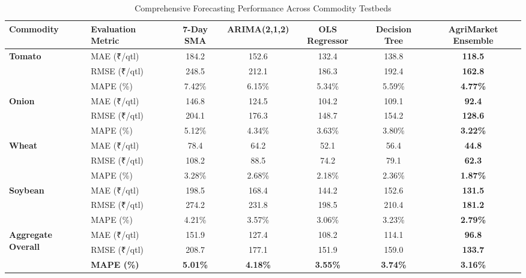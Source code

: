 \documentclass[conference]{IEEEtran}
\begin{document}
\begin{table}[htbp]
\caption{Comprehensive Forecasting Performance Across Commodity Testbeds}
\begin{center}
\begin{tabular}{llccccc}
\toprule
\textbf{Commodity} & \textbf{Evaluation Metric} & \textbf{7-Day SMA} & \textbf{ARIMA(2,1,2)} & \textbf{OLS Regressor} & \textbf{Decision Tree} & \textbf{AgriMarket Ensemble} \\
\midrule
\multirow{3}{*}{\textbf{Tomato}} 
& MAE (₹/qtl)   & 184.2 & 152.6 & 132.4 & 138.8 & \textbf{118.5} \\
& RMSE (₹/qtl)  & 248.5 & 212.1 & 186.3 & 192.4 & \textbf{162.8} \\
& MAPE (\%)     & 7.42\% & 6.15\% & 5.34\% & 5.59\% & \textbf{4.77\%} \\
\midrule
\multirow{3}{*}{\textbf{Onion}} 
& MAE (₹/qtl)   & 146.8 & 124.5 & 104.2 & 109.1 & \textbf{92.4} \\
& RMSE (₹/qtl)  & 204.1 & 176.3 & 148.7 & 154.2 & \textbf{128.6} \\
& MAPE (\%)     & 5.12\% & 4.34\% & 3.63\% & 3.80\% & \textbf{3.22\%} \\
\midrule
\multirow{3}{*}{\textbf{Wheat}} 
& MAE (₹/qtl)   & 78.4 & 64.2 & 52.1 & 56.4 & \textbf{44.8} \\
& RMSE (₹/qtl)  & 108.2 & 88.5 & 74.2 & 79.1 & \textbf{62.3} \\
& MAPE (\%)     & 3.28\% & 2.68\% & 2.18\% & 2.36\% & \textbf{1.87\%} \\
\midrule
\multirow{3}{*}{\textbf{Soybean}} 
& MAE (₹/qtl)   & 198.5 & 168.4 & 144.2 & 152.6 & \textbf{131.5} \\
& RMSE (₹/qtl)  & 274.2 & 231.8 & 198.5 & 210.4 & \textbf{181.2} \\
& MAPE (\%)     & 4.21\% & 3.57\% & 3.06\% & 3.23\% & \textbf{2.79\%} \\
\midrule
\multirow{3}{*}{\textbf{Aggregate Overall}} 
& MAE (₹/qtl)   & 151.9 & 127.4 & 108.2 & 114.1 & \textbf{96.8} \\
& RMSE (₹/qtl)  & 208.7 & 177.1 & 151.9 & 159.0 & \textbf{133.7} \\
& \textbf{MAPE (\%)} & \textbf{5.01\%} & \textbf{4.18\%} & \textbf{3.55\%} & \textbf{3.74\%} & \textbf{3.16\%} \\
\bottomrule
\end{tabular}
\label{tab:benchmarks}
\end{center}
\end{table}
\end{document}
